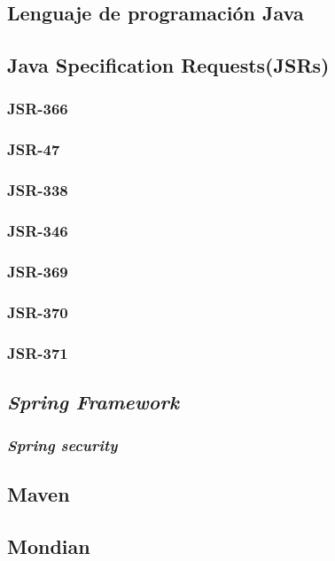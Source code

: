 	\subsection{Lenguaje de programaci\'{o}n Java}
			\lipsum[1-2]
	\subsection{Java Specification Requests(JSRs)}
		\subsubsection{JSR-366}
				\lipsum[1-2]
		\subsubsection{JSR-47}
				\lipsum[1-2]
		\subsubsection{JSR-338}
				\lipsum[1-2]
		\subsubsection{JSR-346}
				\lipsum[1-2]
		\subsubsection{JSR-369}
				\lipsum[1-2]
		\subsubsection{JSR-370}
		\lipsum[1-2]
		\subsubsection{JSR-371}
		\lipsum[1-2]
	\subsection{\textit{Spring Framework}}
			\lipsum[1-2]
		\subsubsection{\textit{Spring security}}
				\lipsum[1-2]
	\subsection{Maven}
			\lipsum[1-2]
	\subsection{Mondian}
			\lipsum[1-2]
